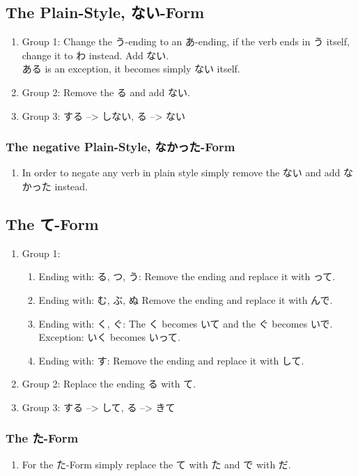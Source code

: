 \documentclass{article}
\newcommand\tab[1][1cm]{\hspace*{#1}}
\newcommand\tabyon[1][0.4cm]{\hspace*{#1}}
\begin{document}
\subsection{The Plain-Style, ない-Form }
\begin{enumerate}
\item Group 1: Change the う-ending to an あ-ending, if the verb ends in う itself, 
change it to わ instead.
Add ない. \\ \tab ある is an exception, it becomes simply ない itself.
\item Group 2: Remove the る and add ない. 
\item Group 3: する --> しない, \tabyon {}る --> ない
\end{enumerate}
\subsubsection{The negative Plain-Style, なかった-Form}
\begin{enumerate}
\item In order to negate any verb in plain style simply remove the ない and add なかった instead.
\end{enumerate}
\subsection{The て-Form}
\begin{enumerate} \item Group 1:
\begin{enumerate} \item Ending with: る, つ, う: Remove the ending and replace it with って.
\item Ending with: む, ぶ, ぬ Remove the ending and replace it with んで.
\item Ending with: く, ぐ: The く becomes いて and the ぐ becomes いで. Exception: いく becomes いって.
\item Ending with: す: Remove the ending and replace it with して.
\end{enumerate}
\item Group 2: Replace the ending る with て.
\item Group 3: する --> して, \tabyon {}る --> きて
\end{enumerate}
\subsubsection{The た-Form}
\begin{enumerate}
\item For the た-Form simply replace the て with た and で with だ.
\end{enumerate}
\end{document}
